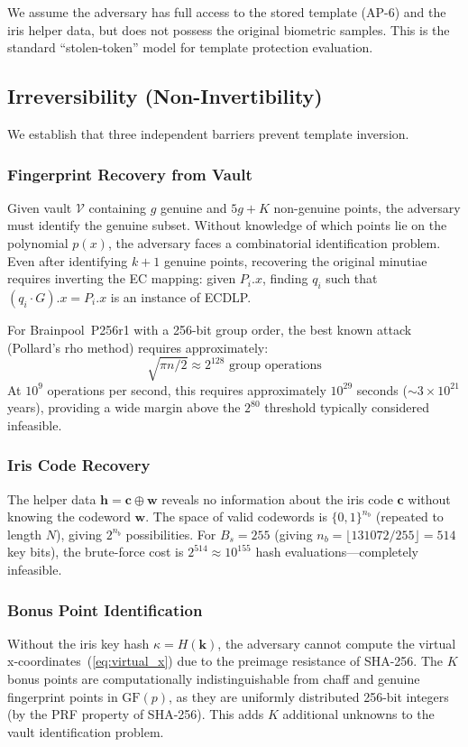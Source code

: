 \documentclass[3p,twocolumn]{elsarticle}
\newcommand{\GFp}{\mathrm{GF}(p)}
\begin{document}
We assume the adversary has full access to the stored template (AP-6) and the iris helper data, but does not possess the original biometric samples. This is the standard ``stolen-token'' model for template protection evaluation.

\subsection{Irreversibility (Non-Invertibility)}
\label{sec:irreversibility}

We establish that three independent barriers prevent template inversion.

\subsubsection{Fingerprint Recovery from Vault}
Given vault $\mathcal{V}$ containing $g$ genuine and $5g + K$ non-genuine points, the adversary must identify the genuine subset. Without knowledge of which points lie on the polynomial $p(x)$, the adversary faces a combinatorial identification problem. Even after identifying $k+1$ genuine points, recovering the original minutiae requires inverting the EC mapping: given $P_i.x$, finding $q_i$ such that $(q_i \cdot G).x = P_i.x$ is an instance of ECDLP.

For Brainpool~P256r1 with a 256-bit group order, the best known attack (Pollard's rho method) requires approximately:
\begin{equation}
    \sqrt{\pi n / 2} \approx 2^{128} \text{ group operations}
    \label{eq:ecdlp_cost}
\end{equation}
At $10^9$ operations per second, this requires approximately $10^{29}$ seconds ($\sim\! 3 \times 10^{21}$ years), providing a wide margin above the $2^{80}$ threshold typically considered infeasible.

\subsubsection{Iris Code Recovery}
The helper data $\mathbf{h} = \mathbf{c} \oplus \mathbf{w}$ reveals no information about the iris code $\mathbf{c}$ without knowing the codeword $\mathbf{w}$. The space of valid codewords is $\{0,1\}^{n_b}$ (repeated to length $N$), giving $2^{n_b}$ possibilities. For $B_s = 255$ (giving $n_b = \lfloor 131072/255 \rfloor = 514$ key bits), the brute-force cost is $2^{514} \approx 10^{155}$ hash evaluations---completely infeasible.

\subsubsection{Bonus Point Identification}
Without the iris key hash $\kappa = H(\mathbf{k})$, the adversary cannot compute the virtual x-coordinates~(\ref{eq:virtual_x}) due to the preimage resistance of SHA-256. The $K$ bonus points are computationally indistinguishable from chaff and genuine fingerprint points in $\GFp{}$, as they are uniformly distributed 256-bit integers (by the PRF property of SHA-256). This adds $K$ additional unknowns to the vault identification problem.
\end{document}
